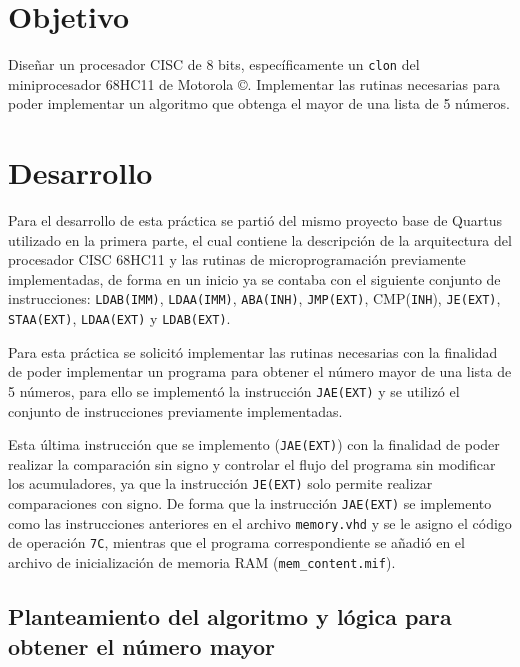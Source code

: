 \documentclass[letterpaper,12pt]{article}
\newcommand{\hx}[1]{\texttt{#1}}
\begin{document}

\newpage

\section{Objetivo}
Diseñar un procesador CISC de 8 bits, específicamente un \texttt{clon} del miniprocesador 68HC11 de Motorola \copyright. Implementar las rutinas necesarias para poder implementar un algoritmo que obtenga el mayor de una lista de 5 números.

\section{Desarrollo}

Para el desarrollo de esta práctica se partió del mismo proyecto base de Quartus utilizado en la primera parte, el cual contiene la descripción de la arquitectura del procesador CISC 68HC11 y las rutinas de microprogramación previamente implementadas, de forma en un inicio ya se contaba con el siguiente conjunto de instrucciones: \texttt{LDAB(IMM)}, \texttt{LDAA(IMM)}, \texttt{ABA(INH)}, \texttt{JMP(EXT)}, CMP(\texttt{INH}), \texttt{JE(EXT)}, \texttt{STAA(EXT)}, \texttt{LDAA(EXT)} y \texttt{LDAB(EXT)}.

Para esta práctica se solicitó implementar las rutinas necesarias con la finalidad de poder implementar un programa para obtener el número mayor de una lista de 5 números, para ello se implementó la instrucción \texttt{JAE(EXT)} y se utilizó el conjunto de instrucciones previamente implementadas.

Esta última instrucción que se implemento (\texttt{JAE(EXT)}) con la finalidad de poder realizar la comparación sin signo y controlar el flujo del programa sin modificar los acumuladores, ya que la instrucción \texttt{JE(EXT)} solo permite realizar comparaciones con signo. De forma que la instrucción \texttt{JAE(EXT)} se implemento como las instrucciones anteriores en el archivo \texttt{memory.vhd} y se le asigno el código de operación \hx{7C}, mientras que el programa correspondiente se añadió en el archivo de inicialización de memoria RAM (\texttt{mem\_content.mif}).


\subsection{Planteamiento del algoritmo y lógica para obtener el número mayor}
\end{document}
